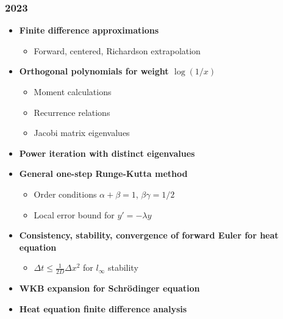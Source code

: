 \subsubsection*{2023}
\begin{itemize}
    \item \textbf{Finite difference approximations}
        \begin{itemize}
            \item Forward, centered, Richardson extrapolation
        \end{itemize}
    \item \textbf{Orthogonal polynomials for weight $\log(1/x)$}
        \begin{itemize}
            \item Moment calculations
            \item Recurrence relations
            \item Jacobi matrix eigenvalues
        \end{itemize}
    \item \textbf{Power iteration with distinct eigenvalues}
    \item \textbf{General one-step Runge-Kutta method}
        \begin{itemize}
            \item Order conditions $\alpha+\beta=1$, $\beta\gamma=1/2$
            \item Local error bound for $y' = -\lambda y$
        \end{itemize}
    \item \textbf{Consistency, stability, convergence of forward Euler for heat equation}
        \begin{itemize}
            \item $\Delta t \leq \frac{1}{2D}\Delta x^2$ for $l_\infty$ stability
        \end{itemize}
    \item \textbf{WKB expansion for Schr\"odinger equation}
    \item \textbf{Heat equation finite difference analysis}
\end{itemize}

